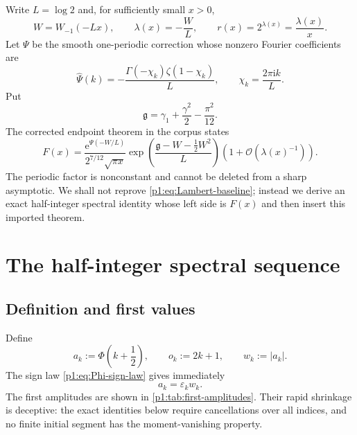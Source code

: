 \documentclass[11pt,oneside]{article}
\theoremstyle{definition}
\theoremstyle{remark}
\newcommand{\e}{\mathrm e}
\newcommand{\ii}{\mathrm i}
\newcommand{\bigO}{\mathcal O}
\newcommand{\eps}{\varepsilon}
\newcommand{\PhiU}{\Phi}
\begin{document}
Write $L=\log2$ and, for sufficiently small $x>0$,
\begin{equation}\label{p1:eq:lambda-W-def}
 W=W_{-1}(-Lx),
 \qquad
 \lambda(x)=-\frac WL,
 \qquad
 r(x)=2^{\lambda(x)}=\frac{\lambda(x)}x.
\end{equation}
Let $\Psi$ be the smooth one-periodic correction whose nonzero Fourier
coefficients are
\begin{equation}\label{p1:eq:Psi-coeff-baseline}
 \widehat\Psi(k)=-\frac{\Gamma(-\chi_k)\zeta(1-\chi_k)}L,
 \qquad
 \chi_k=\frac{2\pi\ii k}{L}.
\end{equation}
Put
\begin{equation}\label{p1:eq:g-constant}
 \mathfrak g=\gamma_1+\frac{\gamma^2}{2}-\frac{\pi^2}{12}.
\end{equation}
The corrected endpoint theorem in the corpus states
\begin{equation}\label{p1:eq:Lambert-baseline}
 F(x)=
 \frac{\e^{\Psi(-W/L)}}{2^{7/12}\sqrt{\pi x}}
 \exp\!\left(\frac{\mathfrak g-W-\tfrac12W^2}{L}\right)
 \left(1+\bigO\!\left(\lambda(x)^{-1}\right)\right).
\end{equation}
The periodic factor is nonconstant and cannot be deleted from a sharp
asymptotic.  We shall not reprove \eqref{p1:eq:Lambert-baseline}; instead we derive
an exact half-integer spectral identity whose left side is $F(x)$ and then
insert this imported theorem.

\section{The half-integer spectral sequence}\label{p1:sec:half-spectrum}

\subsection{Definition and first values}

Define
\begin{equation}\label{p1:eq:a-k-def}
 a_k:=\PhiU\!\left(k+\frac12\right),
 \qquad
 o_k:=2k+1,
 \qquad
 w_k:=|a_k|.
\end{equation}
The sign law \eqref{p1:eq:Phi-sign-law} gives immediately
\begin{equation}\label{p1:eq:a-sign}
 a_k=\eps_k w_k.
\end{equation}
The first amplitudes are shown in \cref{p1:tab:first-amplitudes}.  Their rapid
shrinkage is deceptive: the exact identities below require cancellations over
all indices, and no finite initial segment has the moment-vanishing property.
\end{document}
